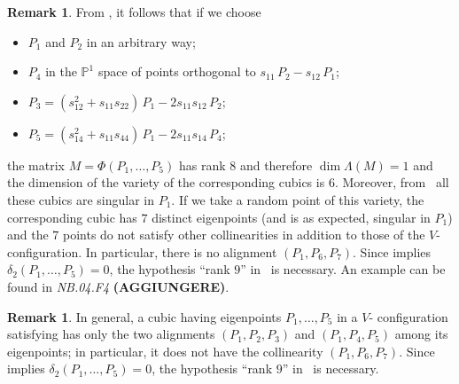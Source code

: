 \documentclass[a4paper, 11pt, reqno]{amsart}
\theoremstyle{plain}
\theoremstyle{definition}
\newtheorem{rmk}[lemma]{Remark}
\newcommand{\p}{\mathbb{P}}
\newcommand{\nb}[2]{\textsl{{NB}.{#1}.{#2}}}
\newcommand{\iso}{\mathcal{Q}_{\mathrm{iso}}}
\begin{document}
\begin{rmk}
From , it follows that if we choose
%
\begin{itemize}
  \item $P_1$ and $P_2$ in an arbitrary way;
  \item $P_4$ in the $\p^1$
  space of points orthogonal to $s_{11} \, P_2 - s_{12} \, P_1$;
  \item $P_3 = (s_{12}^2+s_{11}s_{22}) \, P_1 - 2s_{11}s_{12} \, P_2$;
  \item $P_5 = (s_{14}^2+s_{11}s_{44}) \, P_1 - 2s_{11}s_{14} \, P_4$;
\end{itemize}
%
the matrix $M = \Phi(P_1, \dots, P_5)$ has rank $8$
and therefore $\dim \Lambda(M) = 1$ and the dimension of the variety
of the corresponding cubics is $6$.
Moreover, from~ all these cubics
are singular in $P_1$.
If we take a random point of this variety, the corresponding
cubic has $7$ distinct eigenpoints (and is as expected, singular in $P_1$) and the
$7$ points do not satisfy other collinearities in addition to those of the
$V$- configuration.
In particular, there is no alignment $(P_1, P_6, P_7)$.
Since  implies $\delta_2(P_1, \dots, P_5) = 0$, the hypothesis ``rank $9$'' in~ is necessary. An example can be found in \nb{04}{F4} \textbf{(AGGIUNGERE)}.
\end{rmk}

\begin{rmk}
\label{rmk:particular_cases}
In general, a cubic having eigenpoints $P_1, \dots, P_5$ in a $V$- configuration satisfying  has only the two alignments $(P_1, P_2, P_3)$ and $(P_1, P_4, P_5)$ among its eigenpoints;
in particular, it does not have the collinearity $(P_1, P_6, P_7)$.
Since  implies $\delta_2(P_1, \dots, P_5) = 0$, the hypothesis ``rank $9$'' in~ is necessary.
\end{rmk}
\end{document}
